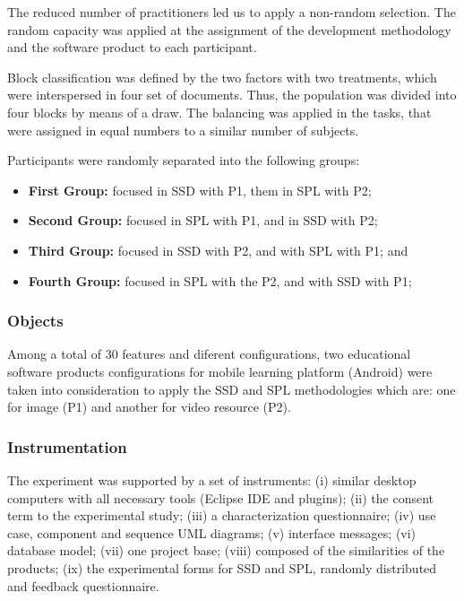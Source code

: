 The reduced number of practitioners led us to apply a non-random selection. The random capacity was applied at the assignment of the development methodology and the software product to each participant. 

Block classification was defined by the two factors with two treatments, which were interspersed in four set of documents. Thus, the population was divided into four blocks by means of a draw. The balancing was applied in the tasks, that were assigned in equal numbers to a similar number of subjects.

Participants were randomly separated into the following groups:

\begin{itemize}
\item \textbf{First Group:} focused in SSD with P1, them in SPL with P2;

\item \textbf{Second Group:} focused in SPL with P1, and in SSD with P2;

\item \textbf{Third Group:} focused in SSD with P2, and with SPL with P1; and

\item \textbf{Fourth Group:} focused in SPL with the P2, and with SSD with P1;
\end{itemize}


\subsubsection{Objects}

Among a total of 30 features and diferent configurations, two educational software products configurations for mobile learning platform (Android) were taken into consideration to apply the SSD and SPL methodologies which are: one for image (P1) and another for video resource (P2).

\subsubsection{Instrumentation}

The experiment was supported by a set of instruments: (i) similar desktop computers with all necessary tools (Eclipse IDE and plugins); (ii) the consent term to the experimental study; (iii) a characterization questionnaire; (iv) use case, component and sequence UML diagrams; (v) interface messages; (vi) database model; (vii) one project base; (viii) composed of the similarities of the products; (ix) the experimental forms for SSD and SPL, randomly distributed and feedback questionnaire.

